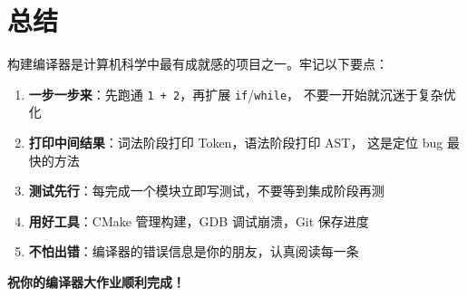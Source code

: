\documentclass[12pt, a4paper]{ctexart}
\begin{document}
\section{总结}

构建编译器是计算机科学中最有成就感的项目之一。牢记以下要点：

\begin{enumerate}
  \item \textbf{一步一步来}：先跑通 \texttt{1 + 2}，再扩展 \texttt{if}/\texttt{while}，
        不要一开始就沉迷于复杂优化
  \item \textbf{打印中间结果}：词法阶段打印 Token，语法阶段打印 AST，
        这是定位 bug 最快的方法
  \item \textbf{测试先行}：每完成一个模块立即写测试，不要等到集成阶段再测
  \item \textbf{用好工具}：CMake 管理构建，GDB 调试崩溃，Git 保存进度
  \item \textbf{不怕出错}：编译器的错误信息是你的朋友，认真阅读每一条
\end{enumerate}

\vspace{1.5cm}
\begin{center}
  \Large\bfseries\color{NavyBlue} 祝你的编译器大作业顺利完成！
\end{center}
\end{document}
